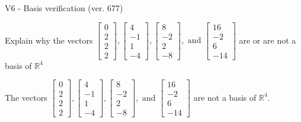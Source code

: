 \begin{exercise}
  \begin{exerciseTitle}V6 - Basis verification (ver. 677)\end{exerciseTitle}
  \begin{exerciseStatement}
    Explain why the vectors \(\left[\begin{array}{r}
0 \\
2 \\
2 \\
2
\end{array}\right] , \left[\begin{array}{r}
4 \\
-1 \\
1 \\
-4
\end{array}\right] , \left[\begin{array}{r}
8 \\
-2 \\
2 \\
-8
\end{array}\right] , \text{ and } \left[\begin{array}{r}
16 \\
-2 \\
6 \\
-14
\end{array}\right]\) are or are not a basis of \(\mathbb{R}^4\)	


  \end{exerciseStatement}
  \begin{exerciseAnswer}
   The vectors \(\left[\begin{array}{r}
0 \\
2 \\
2 \\
2
\end{array}\right] , \left[\begin{array}{r}
4 \\
-1 \\
1 \\
-4
\end{array}\right] , \left[\begin{array}{r}
8 \\
-2 \\
2 \\
-8
\end{array}\right] , \text{ and } \left[\begin{array}{r}
16 \\
-2 \\
6 \\
-14
\end{array}\right]\) 
  	 are not  a basis of \(\mathbb{R}^4\).
  


  \end{exerciseAnswer}
\end{exercise}